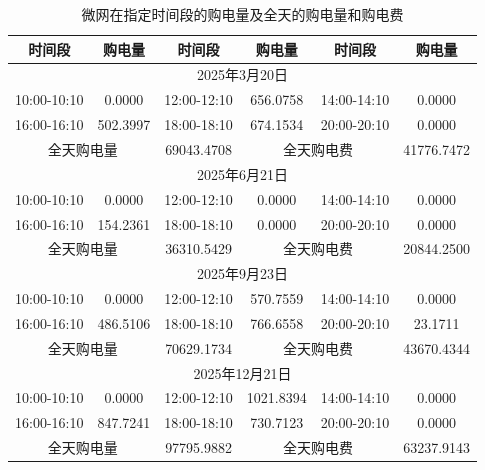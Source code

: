 \documentclass[withoutpreface,bwprint]{cumcmthesis}
\begin{document}
\begin{table}[h!]
	\centering
	\footnotesize
	\renewcommand{\arraystretch}{1.2}
	\setlength{\tabcolsep}{15pt}
	\caption{微网在指定时间段的购电量及全天的购电量和购电费}
	\label{tab:q2_spec_1}
	\begin{tabular}{|c|c|c|c|c|c|}
		\hline
		时间段 & 购电量 & 时间段 & 购电量 & 时间段 & 购电量 \\ \hline
		\multicolumn{6}{|c|}{2025年3月20日} \\ \hline
		10:00-10:10 & 0.0000 & 12:00-12:10 & 656.0758 & 14:00-14:10 & 0.0000 \\ \hline
		16:00-16:10 & 502.3997 & 18:00-18:10 & 674.1534 & 20:00-20:10 & 0.0000 \\ \hline
		\multicolumn{2}{|c|}{全天购电量} & 69043.4708 & \multicolumn{2}{c|}{全天购电费} & 41776.7472 \\ \hline
		\multicolumn{6}{|c|}{2025年6月21日} \\ \hline
		10:00-10:10 & 0.0000 & 12:00-12:10 & 0.0000 & 14:00-14:10 & 0.0000 \\ \hline
		16:00-16:10 & 154.2361 & 18:00-18:10 & 0.0000 & 20:00-20:10 & 0.0000 \\ \hline
		\multicolumn{2}{|c|}{全天购电量} & 36310.5429 & \multicolumn{2}{c|}{全天购电费} & 20844.2500 \\ \hline
		\multicolumn{6}{|c|}{2025年9月23日} \\ \hline
		10:00-10:10 & 0.0000 & 12:00-12:10 & 570.7559 & 14:00-14:10 & 0.0000 \\ \hline
		16:00-16:10 & 486.5106 & 18:00-18:10 & 766.6558 & 20:00-20:10 & 23.1711 \\ \hline
		\multicolumn{2}{|c|}{全天购电量} & 70629.1734 & \multicolumn{2}{c|}{全天购电费} & 43670.4344 \\ \hline
		\multicolumn{6}{|c|}{2025年12月21日} \\ \hline
		10:00-10:10 & 0.0000 & 12:00-12:10 & 1021.8394 & 14:00-14:10 & 0.0000 \\ \hline
		16:00-16:10 & 847.7241 & 18:00-18:10 & 730.7123 & 20:00-20:10 & 0.0000 \\ \hline
		\multicolumn{2}{|c|}{全天购电量} & 97795.9882 & \multicolumn{2}{c|}{全天购电费} & 63237.9143 \\ \hline
	\end{tabular}
\end{table}
\end{document}

